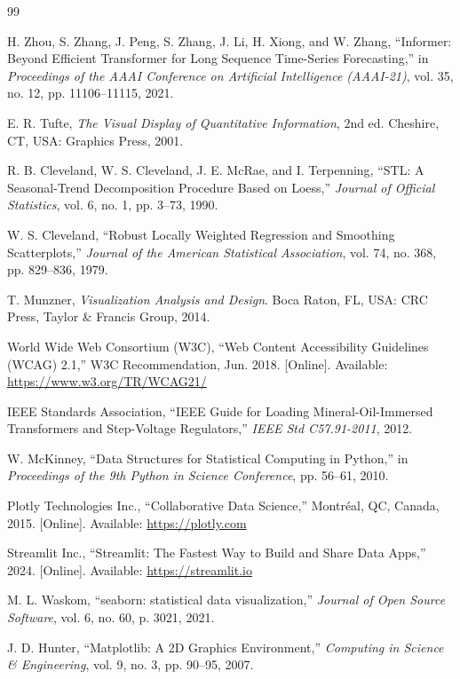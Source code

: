 \documentclass[12pt,a4paper,oneside]{report}
\begin{document}
\begin{thebibliography}{99}

H. Zhou, S. Zhang, J. Peng, S. Zhang, J. Li, H. Xiong, and W. Zhang,
``Informer: Beyond Efficient Transformer for Long Sequence Time-Series Forecasting,''
in \textit{Proceedings of the AAAI Conference on Artificial Intelligence (AAAI-21)},
vol. 35, no. 12, pp. 11106--11115, 2021.

E. R. Tufte,
\textit{The Visual Display of Quantitative Information}, 2nd ed.
Cheshire, CT, USA: Graphics Press, 2001.

R. B. Cleveland, W. S. Cleveland, J. E. McRae, and I. Terpenning,
``STL: A Seasonal-Trend Decomposition Procedure Based on Loess,''
\textit{Journal of Official Statistics}, vol. 6, no. 1, pp. 3--73, 1990.

W. S. Cleveland,
``Robust Locally Weighted Regression and Smoothing Scatterplots,''
\textit{Journal of the American Statistical Association}, vol. 74, no. 368, pp. 829--836, 1979.

T. Munzner,
\textit{Visualization Analysis and Design}.
Boca Raton, FL, USA: CRC Press, Taylor \& Francis Group, 2014.

World Wide Web Consortium (W3C),
``Web Content Accessibility Guidelines (WCAG) 2.1,''
W3C Recommendation, Jun. 2018. [Online]. Available: \url{https://www.w3.org/TR/WCAG21/}

IEEE Standards Association,
``IEEE Guide for Loading Mineral-Oil-Immersed Transformers and Step-Voltage Regulators,''
\textit{IEEE Std C57.91-2011}, 2012.

W. McKinney,
``Data Structures for Statistical Computing in Python,''
in \textit{Proceedings of the 9th Python in Science Conference}, pp. 56--61, 2010.

Plotly Technologies Inc.,
``Collaborative Data Science,'' Montréal, QC, Canada, 2015. [Online]. Available: \url{https://plotly.com}

Streamlit Inc.,
``Streamlit: The Fastest Way to Build and Share Data Apps,'' 2024. [Online]. Available: \url{https://streamlit.io}

M. L. Waskom,
``seaborn: statistical data visualization,''
\textit{Journal of Open Source Software}, vol. 6, no. 60, p. 3021, 2021.

J. D. Hunter,
``Matplotlib: A 2D Graphics Environment,''
\textit{Computing in Science \& Engineering}, vol. 9, no. 3, pp. 90--95, 2007.

\end{thebibliography}
\end{document}
